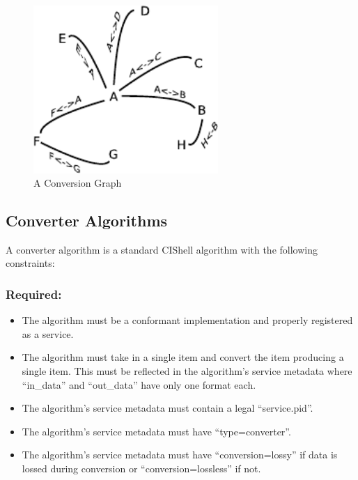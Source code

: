 \begin{figure}[htb!]
\centering
\includegraphics[width=70mm]{../img/conversionGraph.pdf}
\caption{A Conversion Graph}
\label{fig:conversionGraph}
\end{figure}

\subsection{Converter Algorithms}

A converter algorithm is a standard CIShell algorithm with the following
constraints: 

\subsubsection*{Required:}
\begin{itemize}
  \item The algorithm must be a conformant 
  implementation and properly registered as a service.
  \item The algorithm must take in a single  item and convert the
  item producing a single  item. This must be reflected in the
  algorithm's service metadata where ``in\_data'' and ``out\_data'' have only
  one format each.
  \item The algorithm's service metadata must contain a legal ``service.pid''.
  \item The algorithm's service metadata must have ``type=converter''.
  \item The algorithm's service metadata must have ``conversion=lossy'' if
  data is lossed during conversion or ``conversion=lossless'' if not.
\end{itemize}


